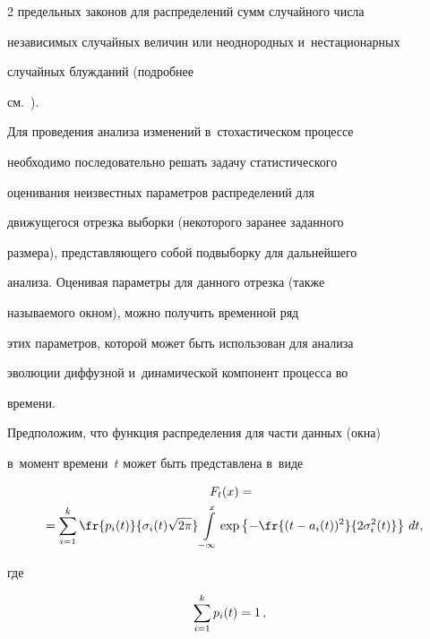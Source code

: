 \begin{multicols}{2}
предельных законов для распределений сумм случайного числа


независи\-мых случайных величин или неоднородных и~нестационарных


случайных блужданий (подробнее


см.~\cite{Korolev2011,Korolev2014,ZaksKorolev2013}).





Для проведения анализа изменений в~стохастическом процессе


необходимо последовательно решать задачу статистического


оценивания неизвестных параметров распределений для


движущегося отрезка выборки (некоторого заранее заданного


размера), представляющего собой подвыборку для дальнейшего


анализа. Оценивая параметры для данного отрезка (также


называемого  окном), можно получить временной ряд


этих параметров, которой может быть использован для анализа


эволюции диффузной и~динамической компонент процесса во


времени.





Предположим, что функция распределения для части данных (окна) 


в~момент времени~$t$ может быть представлена в~виде


\begin{multline}


F_t(x)={}\\


{}=\sum\limits_{i=1}^k


\fr{p_i(t)}{\sigma_i(t)\sqrt{2\pi}}\int\limits_{-\infty}^{x}\exp


\left\{-\fr{(t-a_i


(t))^2}


{2\sigma_i^2(t)}\right\}\,dt, 


\label{Mixture}


\end{multline}


где 


\begin{equation}


\sum\limits_{i=1}^{k}p_{i}(t)=1\,, \enskip



\end{equation}
\end{multicols}
